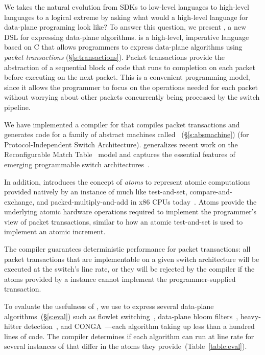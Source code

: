We takes the natural evolution from SDKs to low-level languages to high-level
languages to a logical extreme by asking what would a high-level language for
data-plane programing look like? To answer this question, we present
\pktlanguage, a new DSL for expressing data-plane algorithms. \pktlanguage is a
high-level, imperative language based on C that allows programmers to express
data-plane algorithms using {\em packet transactions} (\S\ref{s:transactions}).
Packet transactions provide the abstraction of a sequential block of code that
runs to completion on each packet before executing on the next packet. This is
a convenient programming model, since it allows the programmer to focus on the
operations needed for each packet without worrying about other packets
concurrently being processed by the switch pipeline.

We have implemented a compiler for \pktlanguage that compiles \pktlanguage
packet transactions and generates code for a family of abstract machines called
\absmachine~(\S\ref{s:absmachine}) (for Protocol-Independent Switch
Architecture). \absmachine generalizes recent work on the Reconfigurable Match
Table~\cite{rmt} model and captures the essential features of emerging
programmable switch architectures~\cite{rmt, xpliant, flexpipe}.

In addition, \absmachine introduces the concept of {\em atoms} to represent
atomic computations provided natively by an instance of \absmachine much like
test-and-set, compare-and-exchange, and packed-multiply-and-add in x86 CPUs
today~\cite{x86_manual}.  Atoms provide the underlying atomic hardware
operations required to implement the programmer's view of packet transactions,
similar to how an atomic test-and-set is used to implement an atomic increment.

The \pktlanguage compiler guarantees deterministic performance for packet
transactions: all packet transactions that are implementable on a given switch
architecture will be executed at the switch's line rate, or they will be
rejected by the compiler if the atoms provided by a \absmachine instance cannot
implement the programmer-supplied transaction.

To evaluate the usefulness of \pktlanguage, we use \pktlanguage to express
several data-plane algorithms~(\S\ref{s:eval}) such as flowlet
switching~\cite{flowlets}, data-plane bloom filters~\cite{bloom}, heavy-hitter
detection~\cite{opensketch}, and CONGA~\cite{conga}---each algorithm taking
up less than a hundred lines of \pktlanguage code.  The \pktlanguage compiler
determines if each algorithm can run at line rate for several instances of
\absmachine that differ in the atoms they provide~(Table~\ref{table:eval}).
